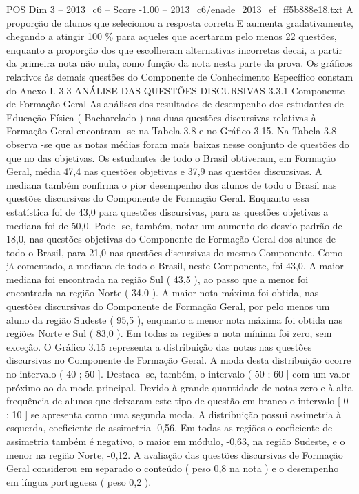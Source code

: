 \begin{textsample}{POS Dim 3 – 2013\_c6 – Score -1.00 – 2013\_c6/enade\_2013\_ef\_ff5b888e18.txt}
A proporção de alunos que selecionou a resposta correta E aumenta gradativamente, chegando a atingir 100 \% para aqueles que acertaram pelo menos 22 questões, enquanto a proporção dos que escolheram alternativas incorretas decai, a partir da primeira nota não nula, como função da nota nesta parte da prova.
Os gráficos relativos às demais questões do Componente de Conhecimento Específico constam do Anexo I. 3.3 ANÁLISE DAS QUESTÕES DISCURSIVAS 3.3.1 Componente de Formação Geral As análises dos resultados de desempenho dos estudantes de Educação Física ( Bacharelado ) nas duas questões discursivas relativas à Formação Geral encontram -se na Tabela 3.8 e no Gráfico 3.15.
Na Tabela 3.8 observa -se que as notas médias foram mais baixas nesse conjunto de questões do que no das objetivas.
Os estudantes de todo o Brasil obtiveram, em Formação Geral, média 47,4 nas questões objetivas e 37,9 nas questões discursivas.
A mediana também confirma o pior desempenho dos alunos de todo o Brasil nas questões discursivas do Componente de Formação Geral.
Enquanto essa estatística foi de 43,0 para questões discursivas, para as questões objetivas a mediana foi de 50,0.
Pode -se, também, notar um aumento do desvio padrão de 18,0, nas questões objetivas do Componente de Formação Geral dos alunos de todo o Brasil, para 21,0 nas questões discursivas do mesmo Componente.
Como já comentado, a mediana de todo o Brasil, neste Componente, foi 43,0.
A maior mediana foi encontrada na região Sul ( 43,5 ), ao passo que a menor foi encontrada na região Norte ( 34,0 ).
A maior nota máxima foi obtida, nas questões discursivas do Componente de Formação Geral, por pelo menos um aluno da região Sudeste ( 95,5 ), enquanto a menor nota máxima foi obtida nas regiões Norte e Sul ( 83,0 ).
Em todas as regiões a nota mínima foi zero, sem exceção.
O Gráfico 3.15 representa a distribuição das notas nas questões discursivas no Componente de Formação Geral.
A moda desta distribuição ocorre no intervalo ( 40 ; 50 ].
Destaca -se, também, o intervalo ( 50 ; 60 ] com um valor próximo ao da moda principal.
Devido à grande quantidade de notas zero e à alta frequência de alunos que deixaram este tipo de questão em branco o intervalo [ 0 ; 10 ] se apresenta como uma segunda moda.
A distribuição possui assimetria à esquerda, coeficiente de assimetria -0,56.
Em todas as regiões o coeficiente de assimetria também é negativo, o maior em módulo, -0,63, na região Sudeste, e o menor na região Norte, -0,12.
A avaliação das questões discursivas de Formação Geral considerou em separado o conteúdo ( peso 0,8 na nota ) e o desempenho em língua portuguesa ( peso 0,2 ).

\end{textsample}
